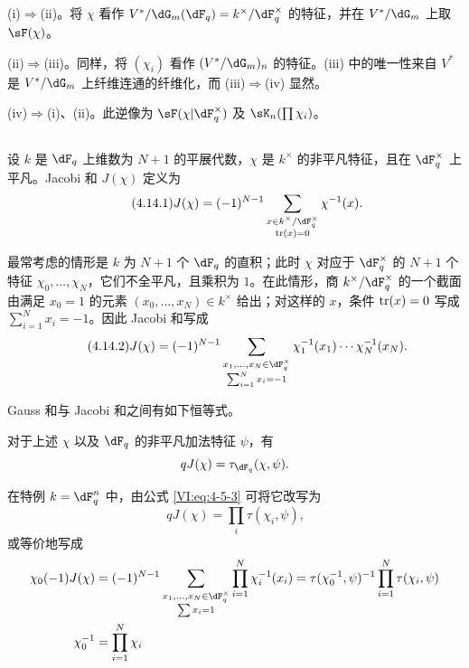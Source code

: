 (i)$\Rightarrow$(ii)。将 $\chi$ 看作 $V^\ast/\dG_m(\dF_q)=k^\times/\dF_q^\times$ 的特征，并在 $V^\ast/\dG_m$ 上取 $\sF(\chi)$。

(ii)$\Rightarrow$(iii)。同样，将 $(\chi_i)$ 看作 $(V^\ast/\dG_m)_n$ 的特征。(iii) 中的唯一性来自 $V^\ast$ 是 $V^\ast/\dG_m$ 上纤维连通的纤维化，而 (iii)$\Rightarrow$(iv) 显然。

(iv)$\Rightarrow$(i)、(ii)。此逆像为 $\sF(\chi|\dF_q^\times)$ 及 $\sK_n(\prod \chi_i)$。

\subsection{}\label{VI:4-14}

设 $k$ 是 $\dF_q$ 上维数为 $N+1$ 的平展代数，$\chi$ 是 $k^\times$ 的非平凡特征，且在 $\dF_q^\times$ 上平凡。Jacobi 和 $J(\chi)$ 定义为
\begin{equation*}\tag{4.14.1}\label{VI:eq:4-14-1}
  J(\chi) = (-1)^{N-1} \sum_{\substack{x\in k^\times/\dF_q^\times \\ \tr(x)=0}} \chi^{-1}(x) \text{.}
\end{equation*}

最常考虑的情形是 $k$ 为 $N+1$ 个 $\dF_q$ 的直积；此时 $\chi$ 对应于 $\dF_q^\times$ 的 $N+1$ 个特征 $\chi_0,\ldots,\chi_N$，它们不全平凡，且乘积为 $1$。在此情形，商 $k^\times/\dF_q^\times$ 的一个截面由满足 $x_0=1$ 的元素 $(x_0,\ldots,x_N)\in k^{\times}$ 给出；对这样的 $x$，条件 $\operatorname{tr}(x)=0$ 写成 $\sum_{i=1}^N x_i=-1$。因此 Jacobi 和写成
\begin{equation*}\tag{4.14.2}\label{VI:eq:4-14-2}
  J(\chi)=(-1)^{N-1}\sum_{\substack{x_1,\ldots,x_N\in\dF_q^\times\\ \sum_{i=1}^N x_i=-1}}\chi_1^{-1}(x_1)\cdots\chi_N^{-1}(x_N)\text{.}
\end{equation*}

Gauss 和与 Jacobi 和之间有如下恒等式。

\begin{proposition_}\label{VI:4-15}
对于上述 $\chi$ 以及 $\dF_q$ 的非平凡加法特征 $\psi$，有
\[
  q J(\chi) = \tau_{\dF_q}(\chi,\psi) \text{.}
\]
\end{proposition_}

在特例 $k=\dF_q^n$ 中，由公式 \eqref{VI:eq:4-5-3} 可将它改写为
\begin{equation*}\tag{4.15.1}\label{VI:eq:4-15-1}
  q J(\chi) = \prod_i \tau(\chi_i,\psi) \text{,}
\end{equation*}
或等价地写成
\begin{align*}
  \chi_0(-1) J(\chi) &= (-1)^{N-1} \sum_{\substack{x_1,\dots,x_N\in \dF_q^\times \\ \sum x_i = 1}} \prod_{i=1}^N \chi_i^{-1}(x_i) = \tau(\chi_0^{-1},\psi)^{-1} \prod_{i=1}^N \tau(\chi_i,\psi) \\
  \chi_0^{-1} &= \prod_{i=1}^N \chi_i
\end{align*}

